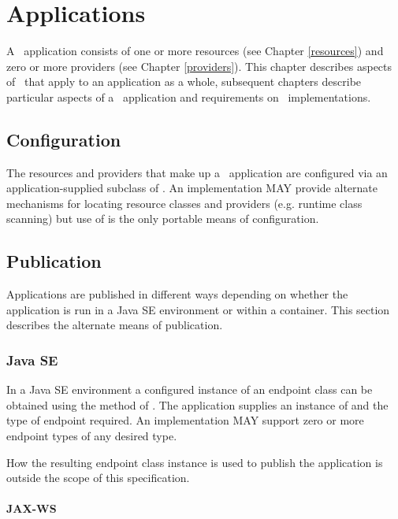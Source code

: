 \chapter{Applications}
\label{applications}

A \jaxrs\ application consists of one or more resources (see Chapter \ref{resources}) and zero or more providers (see Chapter \ref{providers}). This chapter describes aspects of \jaxrs\ that apply to an application as a whole, subsequent chapters describe particular aspects of a \jaxrs\ application and requirements on \jaxrs\ implementations.

\section{Configuration}
\label{config}

The resources and providers that make up a \jaxrs\ application are configured via an application-supplied subclass of . An implementation MAY provide alternate mechanisms for locating resource classes and providers (e.g. runtime class scanning) but use of  is the only portable means of configuration.

\section{Publication}

Applications are published in different ways depending on whether the application is run in a Java SE environment or within a container. This section describes the alternate means of publication.

\subsection{Java SE}

In a Java SE environment a configured instance of an endpoint class can be obtained using the  method of \rd. The application supplies an instance of  and the type of endpoint required. An implementation MAY support zero or more endpoint types of any desired type.

How the resulting endpoint class instance is used to publish the application is outside the scope of this specification.

\subsubsection{JAX-WS}


